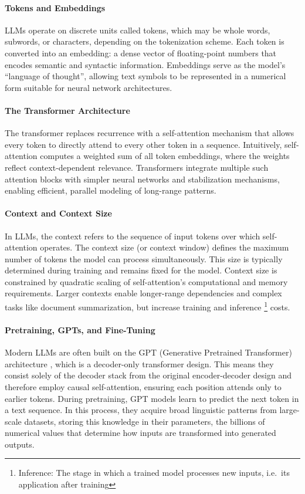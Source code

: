 \paragraph{Tokens and Embeddings}  
LLMs operate on discrete units called tokens, which may be whole words, subwords, or characters, depending on the tokenization scheme.
Each token is converted into an embedding: a dense vector of floating-point numbers that encodes semantic and syntactic information.
Embeddings serve as the model's \enquote{language of thought}, allowing text symbols to be represented in a numerical form suitable for neural network architectures.

\paragraph{The Transformer Architecture}  
The transformer \cite{attention} replaces recurrence with a self-attention mechanism that allows every token to directly attend to every other token in a sequence.
Intuitively, self-attention computes a weighted sum of all token embeddings, where the weights reflect context-dependent relevance.
Transformers integrate multiple such attention blocks with simpler neural networks and stabilization mechanisms, enabling efficient, parallel modeling of long-range patterns.

\paragraph{Context and Context Size \cite{llm-survey}}
In LLMs, the context refers to the sequence of input tokens over which self-attention operates.
The context size (or context window) defines the maximum number of tokens the model can process simultaneously.
This size is typically determined during training and remains fixed for the model.
Context size is constrained by quadratic scaling of self-attention's computational and memory requirements.
Larger contexts enable longer-range dependencies and complex tasks like document summarization, but increase training and inference%
\footnote{Inference: The stage in which a trained model processes new inputs, i.e.\ its application after training
}
costs.

\paragraph{Pretraining, GPTs, and Fine-Tuning}  
Modern LLMs are often built on the GPT (Generative Pretrained Transformer) architecture \cite{gpt-family-paper}, which is a decoder-only transformer design.
This means they consist solely of the decoder stack from the original encoder-decoder design and therefore employ causal self-attention, ensuring each position attends only to earlier tokens.
During pretraining, GPT models learn to predict the next token in a text sequence. 
In this process, they acquire broad linguistic patterns from large-scale datasets, storing this knowledge in their parameters, the billions of numerical values that determine how inputs are transformed into generated outputs.

